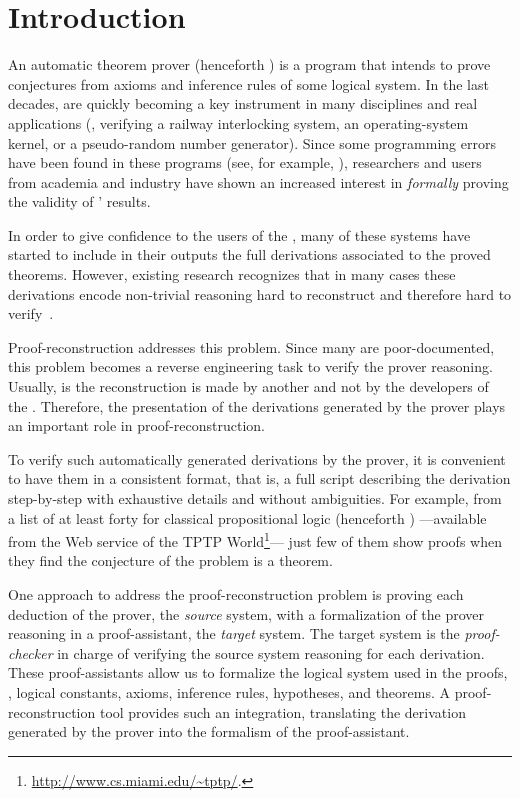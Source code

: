 \documentclass[../paper.tex]{subfiles}
\begin{document}

\section{Introduction}
\label{sec:introduction}

An automatic theorem prover (henceforth \ATP) is a program that
intends to prove conjectures from axioms and inference rules of some
logical system. In the last decades, \ATPs are quickly becoming a key
instrument in many disciplines and real applications (\eg, verifying a
railway interlocking system, an operating-system kernel, or a
pseudo-random number generator). Since some programming errors have
been found in these programs (see, for example,
\cite{Keller2013,Bohme2011,Fleury2014}), researchers and users from
academia and industry have shown an increased interest in
\emph{formally} proving the validity of \ATPs' results.

In order to give confidence to the users of the \ATP, many of these
systems have started to include in their outputs the full derivations
associated to the proved theorems. However, existing research
recognizes that in many cases these derivations encode non-trivial
reasoning hard to reconstruct and therefore hard to
verify~\cite{paulson2007source,Keller2013}.

Proof-reconstruction addresses this problem. Since many \ATPs are
poor-documented, this problem becomes a reverse
engineering task to verify the prover reasoning. Usually, is the
reconstruction is made by another and not by the developers of the
\ATP. Therefore, the presentation of the derivations generated by the
prover plays an important role in proof-reconstruction.

To verify such automatically generated derivations by the prover, it
is convenient to have them in a consistent format, that is, a full
script describing the derivation step-by-step with  exhaustive details
and without ambiguities. For example, from a list of at least forty
\ATPs for classical propositional logic (henceforth \CPL) ---available
from the Web service  of the TPTP
World\footnote{\url{http://www.cs.miami.edu/~tptp/}.}--- just few of
them show proofs when they find the conjecture of the problem is a 
theorem.

One approach to address the proof-reconstruction problem is
proving each deduction of the prover, the \emph{source} system,
with a formalization of the prover reasoning in a proof-assistant, the
\emph{target} system. The target system is the
\emph{proof-checker} in charge of verifying the source system reasoning
for each derivation.
These proof-assistants allow us to formalize the logical system used
in the proofs, \ie, logical constants, axioms, inference rules,
hypotheses, and theorems.
A proof-reconstruction tool provides such an
integration, translating the derivation generated by the prover into
the formalism of the proof-assistant.
\end{document}
